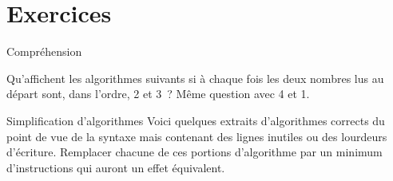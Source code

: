 \section{Exercices}

\begin{Exercice}{Compréhension}

Qu’affichent les algorithmes suivants si à chaque fois les deux nombres
lus au départ sont, dans l’ordre, 2 et 3~? Même question avec 4 et 1.



\end{Exercice}

\begin{Exercice}{Simplification d’algorithmes}
Voici quelques extraits d’algorithmes corrects du point de vue de la
syntaxe mais contenant des lignes inutiles ou des lourdeurs d’écriture.
Remplacer chacune de ces portions d’algorithme par un minimum
d’instructions qui auront un effet équivalent.





\end{Exercice}

